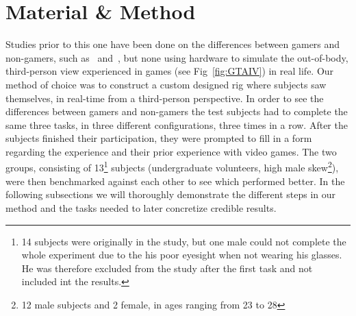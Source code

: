 \documentclass[runningheads,a4paper,oribibl]{llncs}
\begin{document}

\section{Material \& Method}
Studies prior to this one have been done on the differences between gamers and non-gamers, such as~\cite{schmierbach2011exploring} and~\cite{gong2015enhanced}, but none using hardware to simulate the out-of-body, third-person view experienced in games (see Fig~\ref{fig:GTAIV}) in real life. Our method of choice was to construct a custom designed rig where subjects saw themselves, in real-time from a third-person perspective. In order to see the differences between gamers and non-gamers the test subjects had to complete the same three tasks, in three different configurations, three times in a row. After the subjects finished their participation, they were prompted to fill in a form regarding the experience and their prior experience with video games. The two groups, consisting of 13\footnote{14 subjects were originally in the study, but one male could not complete the whole experiment due to the his poor eyesight when not wearing his glasses. He was therefore excluded from the study after the first task and not included int the results.} subjects (undergraduate volunteers, high male skew\footnote{12 male subjects and 2 female, in ages ranging from 23 to 28}), were then benchmarked against each other to see which performed better. In the following subsections we will thoroughly demonstrate the different steps in our method and the tasks needed to later concretize credible results.
\end{document}
